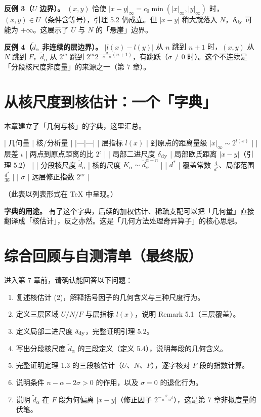 \documentclass[a4paper,11pt,openany]{ctexbook}
\numberwithin{equation}{chapter}
\numberwithin{figure}{chapter}
\numberwithin{table}{chapter}
\begin{document}
\textbf{反例 3（$U$ 边界）。} $(x,y)$ 恰使 $|x-y|_\infty=c_0\min(|x|_\infty,|y|_\infty)$ 时，$(x,y)\in U$（条件含等号），引理 5.2 仍成立。但 $|x-y|$ 稍大就落入 $N$，$\delta_{\rm dy}$ 可能为 $+\infty$。这展示了 $U$ 与 $N$ 的「悬崖」边界。

\textbf{反例 4（$\widetilde d_\alpha$ 非连续的层边界）。} $|l(x)-l(y)|$ 从 $n$ 跳到 $n+1$ 时，$(x,y)$ 从 $N$ 跳到 $F$，$\widetilde d_\alpha$ 从 $2^m$ 跳到 $2^m2^{-\frac{\sigma}{n-\alpha}(n+1)}$，有跳跃（$\sigma\neq0$ 时）。这个不连续是「分段核尺度非度量」的来源之一（第 7 章）。

\section{从核尺度到核估计：一个「字典」}

本章建立了「几何与核」的字典，这里汇总。

| 几何量 | 核/分析量 |
|---|---|
| 层指标 $l(x)$ | 到原点的距离量级 $|x|_\infty\sim2^{l(x)}$ |
| 层差 $\iota$ | 两点到原点距离的比 $2^\iota$ |
| 局部二进尺度 $\delta_{\rm dy}$ | 局部欧氏距离 $|x-y|$（引理 5.2） |
| 分段核尺度 $\widetilde d_\alpha$ | 核的尺度 $K_\alpha\sim\widetilde d_\alpha^{\alpha-n}$ |
| $d^*$ | 覆盖常数 $\frac4{d^*}$、局部范围 $\frac{d^*}{36}$ |
| $\sigma$ | 远层修正指数 $2^{\iota\sigma}$ |

（此表以列表形式在 TeX 中呈现。）

\textbf{字典的用途。} 有了这个字典，后续的加权估计、稀疏支配可以把「几何量」直接翻译成「核估计」，反之亦然。这是「几何方法处理奇异算子」的核心思想。

\section{综合回顾与自测清单（最终版）}

进入第 7 章前，请确认能回答以下问题：

\begin{enumerate}
\item 复述核估计 (2)，解释括号因子的几何含义与三种尺度行为。
\item 定义三层区域 $U/N/F$ 与层指标 $l(x)$，说明 Remark 5.1（三层覆盖）。
\item 定义局部二进尺度 $\delta_{\rm dy}$，完整证明引理 5.2。
\item 写出分段核尺度 $\widetilde d_\alpha$ 的三段定义（定义 5.4），说明每段的几何含义。
\item 完整证明定理 1.3 的三段核估计（$U$、$N$、$F$），逐字核对 $F$ 段的指数计算。
\item 说明条件 $n-\alpha-2\sigma>0$ 的作用，以及 $\sigma=0$ 的退化行为。
\item 说明 $\widetilde d_\alpha$ 在 $F$ 段为何偏离 $|x-y|$（修正因子 $2^{-\frac{\sigma}{n-\alpha}\iota}$），这是第 7 章非拟度量的伏笔。
\end{enumerate}
\end{document}
